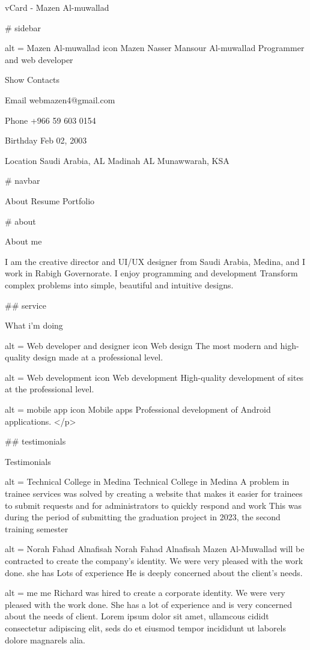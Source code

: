 vCard - Mazen Al-muwallad

# sidebar

alt = Mazen Al-muwallad icon
Mazen Nasser Mansour Al-muwallad
Programmer and web developer

Show Contacts

Email
webmazen4@gmail.com

Phone
+966 59 603 0154

Birthday
Feb 02, 2003

Location
Saudi Arabia, AL Madinah AL Munawwarah, KSA

# navbar

About
Resume
Portfolio



# about

About me

I am the creative director and UI/UX designer from Saudi Arabia, Medina, and I work in Rabigh Governorate.
            I enjoy programming and development
            Transform complex problems into simple, beautiful and intuitive designs.

## service

What i'm doing

alt = Web developer and designer icon
Web design
The most modern and high-quality design made at a professional level.

alt = Web development icon
Web development
High-quality development of sites at the professional level.

alt = mobile app icon
Mobile apps
Professional development of Android applications.                </p>



## testimonials

Testimonials

alt = Technical College in Medina
Technical College in Medina
A problem in trainee services was solved by creating a website that makes it easier for trainees to submit requests and for administrators to quickly respond and work
This was during the period of submitting the graduation project in 2023, the second training semester

alt = Norah Fahad Alnafisah
Norah Fahad Alnafisah
Mazen Al-Muwallad will be contracted to create the company's identity. We were very pleased with the work done. she has
Lots of experience
He is deeply concerned about the client's needs.

alt = me
me
Richard was hired to create a corporate identity. We were very pleased with the work done. She has a lot of experience and is very concerned about the needs of client. Lorem ipsum dolor sit amet, ullamcous cididt consectetur adipiscing elit, seds do et eiusmod tempor incididunt ut laborels dolore magnarels alia.

